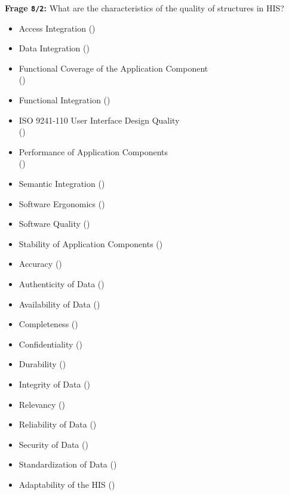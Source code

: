 \textbf{Frage \texttt{8/2}:} What are the characteristics of the quality of structures in HIS?

\begin{itemize}
  \item Access Integration ()
  \item Data Integration ()
  \item Functional Coverage of the Application Component \\
  ()
  \item Functional Integration ()
  \item ISO 9241-110 User Interface Design Quality \\
  ()
  \item Performance of Application Components \\
  ()
  \item Semantic Integration ()
  \item Software Ergonomics ()
  \item Software Quality ()
  \item Stability of Application Components ()
  \item Accuracy ()
  \item Authenticity of Data ()
  \item Availability of Data ()
  \item Completeness ()
  \item Confidentiality ()
  \item Durability ()
  \item Integrity of Data ()
  \item Relevancy ()
  \item Reliability of Data ()
  \item Security of Data ()
  \item Standardization of Data ()
  \item Adaptability of the HIS ()

\end{itemize}
